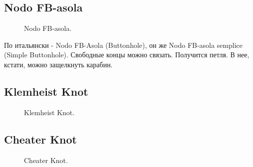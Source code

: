 \subsection{Nodo FB-asola}

\begin{figure}[H]\centering
	\begin{minipage}{1\linewidth}
		\begin{center}
			\tcbox[enhanced jigsaw,colframe=black,opacityframe=0.5,opacityback=0.5]
			{\centering{}}
		\end{center}
	\end{minipage}
\caption{Nodo FB-asola.}
\label{ris:Nodo_FB-asola}
\end{figure}

По итальянски - Nodo FB-Asola (Buttonhole), он же Nodo FB-asola semplice (Simple Buttonhole). Свободные концы можно связать. Получится петля. В нее, кстати, можно защелкнуть карабин.

\subsection{Klemheist Knot}

\begin{figure}[H]\centering
	\begin{minipage}{1\linewidth}
		\begin{center}
			\tcbox[enhanced jigsaw,colframe=black,opacityframe=0.5,opacityback=0.5]
			{\centering{}}
		\end{center}
	\end{minipage}
\caption{Klemheist Knot.}
\label{ris:Klemheist_Knot}
\end{figure}

\subsection{Cheater Knot}

\begin{figure}[H]\centering
	\begin{minipage}{1\linewidth}
		\begin{center}
			\tcbox[enhanced jigsaw,colframe=black,opacityframe=0.5,opacityback=0.5]
			{\centering{}}
		\end{center}
	\end{minipage}
\caption{Cheater Knot.}
\label{ris:Cheater_Knot}
\end{figure}

